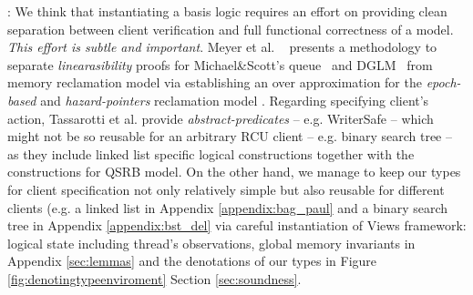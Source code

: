 : We think that instantiating a basis logic requires an effort on providing clean separation between client verification and full functional correctness of a model. \textit{This effort is subtle and important}. Meyer et al. ~\cite{} presents a methodology to separate \textit{linearasibility} proofs for Michael\&Scott's queue~\cite{Michael:1996:SFP:248052.248106} and DGLM~\cite{Doherty:2004:DSB:1007912.1007945} from memory reclamation model via establishing an over approximation for the \textit{epoch-based} and \textit{hazard-pointers} reclamation model . Regarding specifying client's action, Tassarotti et al. provide \textit{abstract-predicates} -- e.g. WriterSafe -- which might not be so reusable for an arbitrary RCU client -- e.g. binary search tree -- as they include linked list specific logical constructions together with the constructions for QSRB model. On the other hand, we manage to keep our types for client specification not only relatively simple but also reusable for different clients (e.g. a linked list in Appendix \ref{appendix:bag_paul} and a binary search tree in Appendix \ref{appendix:bst_del} via careful instantiation of Views framework: logical state including thread's observations, global memory invariants in Appendix \ref{sec:lemmas} and the denotations of our types in Figure \ref{fig:denotingtypeenviroment} Section \ref{sec:soundness}. 
